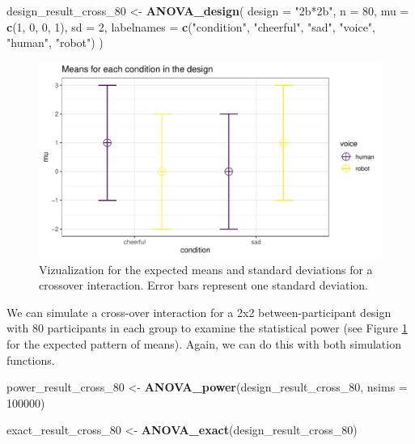 \documentclass[
  ,man,floatsintext]{apa6}
\newenvironment{Shaded}{\begin{snugshade}}{\end{snugshade}}
\newcommand{\DataTypeTok}[1]{\textcolor[rgb]{0.13,0.29,0.53}{#1}}
\newcommand{\DecValTok}[1]{\textcolor[rgb]{0.00,0.00,0.81}{#1}}
\newcommand{\KeywordTok}[1]{\textcolor[rgb]{0.13,0.29,0.53}{\textbf{#1}}}
\newcommand{\NormalTok}[1]{#1}
\newcommand{\StringTok}[1]{\textcolor[rgb]{0.31,0.60,0.02}{#1}}
\begin{document}
\begin{Shaded}
\begin{Highlighting}[]
\NormalTok{design_result_cross_}\DecValTok{80}\NormalTok{ <-}\StringTok{ }\KeywordTok{ANOVA_design}\NormalTok{(}
  \DataTypeTok{design =} \StringTok{"2b*2b"}\NormalTok{,}
  \DataTypeTok{n =} \DecValTok{80}\NormalTok{,}
  \DataTypeTok{mu =} \KeywordTok{c}\NormalTok{(}\DecValTok{1}\NormalTok{, }\DecValTok{0}\NormalTok{, }\DecValTok{0}\NormalTok{, }\DecValTok{1}\NormalTok{),}
  \DataTypeTok{sd =} \DecValTok{2}\NormalTok{,}
  \DataTypeTok{labelnames =} \KeywordTok{c}\NormalTok{(}\StringTok{"condition"}\NormalTok{, }\StringTok{"cheerful"}\NormalTok{, }\StringTok{"sad"}\NormalTok{, }
                 \StringTok{"voice"}\NormalTok{, }\StringTok{"human"}\NormalTok{, }\StringTok{"robot"}\NormalTok{)}
\NormalTok{)}
\end{Highlighting}
\end{Shaded}

\begin{figure}
\centering
\includegraphics{0.1_Simulation_Based_Power_Analysis_For_Factorial_ANOVA_Designs_files/figure-latex/mean-plot-1.pdf}
\caption{\label{fig:mean-plot}Vizualization for the expected means and standard deviations for a crossover interaction. Error bars represent one standard deviation.}
\end{figure}

We can simulate a cross-over interaction for a 2x2 between-participant design with 80 participants in each group to examine the statistical power (see Figure \ref{fig:mean-plot} for the expected pattern of means). Again, we can do this with both simulation functions.

\begin{Shaded}
\begin{Highlighting}[]
\NormalTok{power_result_cross_}\DecValTok{80}\NormalTok{ <-}\StringTok{ }\KeywordTok{ANOVA_power}\NormalTok{(design_result_cross_}\DecValTok{80}\NormalTok{, }
                                     \DataTypeTok{nsims =} \DecValTok{100000}\NormalTok{)}

\NormalTok{exact_result_cross_}\DecValTok{80}\NormalTok{ <-}\StringTok{ }\KeywordTok{ANOVA_exact}\NormalTok{(design_result_cross_}\DecValTok{80}\NormalTok{)}
\end{Highlighting}
\end{Shaded}
\end{document}
